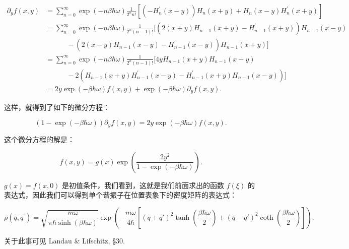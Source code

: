 \begin{linenomath}
    \begin{align}
        \partial_y f(x,y)&=\sum_{n=0}^{\infty} \exp(-n\beta \hbar\omega)\frac{1}{2^n n!} \left[ \left( -H_n^\prime (x-y) \right) H_n(x+y) + H_n(x-y)H_n^\prime(x+y) \right] \\
        &=\sum_{n=0}^{\infty} \exp(-n\beta \hbar\omega)\frac{1}{2^n \left( n-1 \right)!} [ \left( 2\left( x+y \right) H_{n-1}\left( x+y \right) - H_{n-1}^{\prime}\left( x+y \right) \right) H_{n-1}\left( x-y \right) \\  &\quad\quad\quad  -\left( 2\left( x-y \right) H_{n-1}\left( x-y \right) - H_{n-1}^{\prime}\left( x-y \right) \right) H_{n-1}(x+y)]\\
        &=\sum_{n=0}^{\infty} \exp(-n\beta \hbar\omega)\frac{1}{2^n \left( n-1 \right)!} [ 4y H_{n-1}\left( x+y \right) H_{n-1}\left( x-y \right) \\  &\quad\quad\quad - 2(H_{n-1}\left( x+y \right) H_{n-1}^{\prime}\left( x-y \right)  - H_{n-1}^{\prime}\left( x+y \right) H_{n-1}\left( x-y \right)) ] \\
        & = 2y\exp\left( -\beta \hbar\omega \right) f(x,y) + \exp\left( -\beta \hbar\omega \right) \partial_y f(x,y).
    \end{align}
\end{linenomath}
这样，就得到了如下的微分方程：
\begin{linenomath}\begin{equation}
    \left( 1 - \exp\left( -\beta \hbar\omega \right) \right) \partial_y f(x,y) = 2y\exp\left( -\beta \hbar\omega \right) f(x,y).
\end{equation}\end{linenomath}
这个微分方程的解是：
\begin{linenomath}
    \begin{equation}
        f(x,y) = g(x) \exp\left( \frac{2y^2}{1-\exp\left( -\beta \hbar\omega \right)} \right).
    \end{equation}
\end{linenomath}
$g(x) = f(x,0)$ 是初值条件，我们看到，这就是我们前面求出的函数 $f(\xi)$ 的表达式，因此我们可以得到单个谐振子在位置表象下的密度矩阵的表达式：
\begin{linenomath}\begin{equation}
    \boxed{
    \rho\left( q,q^{\prime} \right) = \sqrt{\frac{m\omega}{\pi\hbar\sinh\left( \beta\hbar\omega \right)}} \exp\left( -\frac{m\omega}{4\hbar}\left[ (q+q')^2\tanh\left( \frac{\beta\hbar\omega}{2} \right) + (q-q')^2\coth\left( \frac{\beta\hbar\omega}{2} \right) \right] \right).}
\end{equation}\end{linenomath}
关于此事可见 Landau \& Lifschitz, \S 30.











